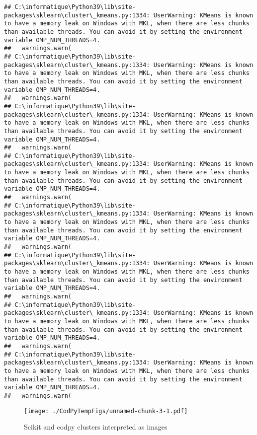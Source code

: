 \documentclass[]{article}
\numberwithin{equation}{section}
\begin{document}
\begin{verbatim}
## C:\informatique\Python39\lib\site-packages\sklearn\cluster\_kmeans.py:1334: UserWarning: KMeans is known to have a memory leak on Windows with MKL, when there are less chunks than available threads. You can avoid it by setting the environment variable OMP_NUM_THREADS=4.
##   warnings.warn(
## C:\informatique\Python39\lib\site-packages\sklearn\cluster\_kmeans.py:1334: UserWarning: KMeans is known to have a memory leak on Windows with MKL, when there are less chunks than available threads. You can avoid it by setting the environment variable OMP_NUM_THREADS=4.
##   warnings.warn(
## C:\informatique\Python39\lib\site-packages\sklearn\cluster\_kmeans.py:1334: UserWarning: KMeans is known to have a memory leak on Windows with MKL, when there are less chunks than available threads. You can avoid it by setting the environment variable OMP_NUM_THREADS=4.
##   warnings.warn(
## C:\informatique\Python39\lib\site-packages\sklearn\cluster\_kmeans.py:1334: UserWarning: KMeans is known to have a memory leak on Windows with MKL, when there are less chunks than available threads. You can avoid it by setting the environment variable OMP_NUM_THREADS=4.
##   warnings.warn(
## C:\informatique\Python39\lib\site-packages\sklearn\cluster\_kmeans.py:1334: UserWarning: KMeans is known to have a memory leak on Windows with MKL, when there are less chunks than available threads. You can avoid it by setting the environment variable OMP_NUM_THREADS=4.
##   warnings.warn(
## C:\informatique\Python39\lib\site-packages\sklearn\cluster\_kmeans.py:1334: UserWarning: KMeans is known to have a memory leak on Windows with MKL, when there are less chunks than available threads. You can avoid it by setting the environment variable OMP_NUM_THREADS=4.
##   warnings.warn(
## C:\informatique\Python39\lib\site-packages\sklearn\cluster\_kmeans.py:1334: UserWarning: KMeans is known to have a memory leak on Windows with MKL, when there are less chunks than available threads. You can avoid it by setting the environment variable OMP_NUM_THREADS=4.
##   warnings.warn(
## C:\informatique\Python39\lib\site-packages\sklearn\cluster\_kmeans.py:1334: UserWarning: KMeans is known to have a memory leak on Windows with MKL, when there are less chunks than available threads. You can avoid it by setting the environment variable OMP_NUM_THREADS=4.
##   warnings.warn(
\end{verbatim}

\begin{figure}
\centering
\texttt{[image: ./CodPyTempFigs/unnamed-chunk-3-1.pdf]}
\caption{\label{plot13}Scikit and codpy clusters interpreted as images}
\end{figure}
\end{document}
